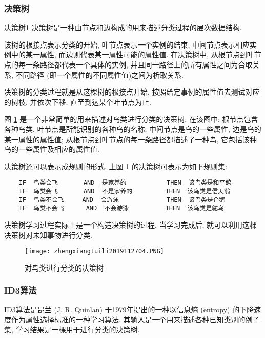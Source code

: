 \subsubsection{决策树}
\begin{mydef}{决策树}{1}
    决策树是一种由节点和边构成的用来描述分类过程的层次数据结构.
\end{mydef}

该树的根接点表示分类的开始, 叶节点表示一个实例的结束, 中间节点表示相应实例中的某一属性, 而边则代表某一属性可能的属性值.
在决策树中, 从根节点到叶节点的每一条路径都代表一个具体的实例, 并且同一路径上的所有属性之间为合取关系, 不同路径 (即一个属性的不同属性值)之间为析取关系.

决策树的分类过程就是从这棵树的根接点开始, 按照给定事例的属性值去测试对应的树枝, 并依次下移, 直至到达某个叶节点为止.

图 \ref{AI32fig2704} 是一个非常简单的用来描述对鸟类进行分类的决策树.
在该图中: 根节点包含各种鸟类, 叶节点是所能识别的各种鸟的名称;
中间节点是鸟的一些属性, 边是鸟的某一属性的属性值;
从根节点到叶节点的每一条路径都描述了一种鸟, 它包括该种鸟的一些属性及相应的属性值.

 决策树还可以表示成规则的形式. 上图 \ref{AI32fig2704} 的决策树可表示为如下规则集:
\begin{Verbatim}
    IF  鸟类会飞       AND  是家养的           THEN  该鸟类是和平鸽
    IF  鸟类会飞       AND  不是家养的         THEN  该鸟类是信天翁
    IF  鸟类不会飞     AND  会游泳             THEN  该鸟类是企鹅
    IF  鸟类不会飞      AND  不会游泳          THEN  该鸟类是鸵鸟
\end{Verbatim}

决策树学习过程实际上是一个构造决策树的过程. 当学习完成后, 就可以利用这棵决策树对未知事物进行分类.
\begin{figure}[H]
\centering
\texttt{[image: zhengxiangtuili2019112704.PNG]}
\caption{对鸟类进行分类的决策树}
\label{AI32fig2704}
\end{figure}
\subsubsection{ID3算法}
ID3算法是昆兰  (J. R. Quinlan) 于1979年提出的一种以信息熵  (entropy) 的下降速度作为属性选择标准的一种学习算法.
其输入是一个用来描述各种已知类别的例子集, 学习结果是一棵用于进行分类的决策树.

